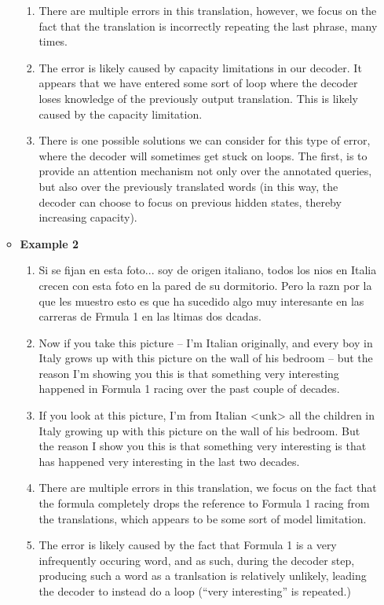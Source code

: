 \documentclass[12pt]{article}
\begin{document}
\begin{enumerate}[label=(\alph*)]
\begin{itemize}
\begin{enumerate}[label=\arabic*]
          \item There are multiple errors in this translation, however, we focus on the fact that the translation is incorrectly repeating the last phrase, many times.
          \item The error is likely caused by capacity limitations in our decoder. It appears that we have entered some sort of loop where the decoder loses knowledge of the previously output translation. This is likely caused by the capacity limitation.
          \item There is one possible solutions we can consider for this type of error, where the decoder will sometimes get stuck on loops. The first, is to provide an attention mechanism not only over the annotated queries, but also over the previously translated words (in this way, the decoder can choose to focus on previous hidden states, thereby increasing capacity).
        \end{enumerate}
      \item \textbf{Example 2}
        \begin{enumerate}[label=\arabic*]
          \item Si se fijan en esta foto... soy de origen italiano, todos los nios en Italia crecen con esta foto en la pared de su dormitorio. Pero la razn por la que les muestro esto es que ha sucedido algo muy interesante en las carreras de Frmula 1 en las ltimas dos dcadas.
          \item Now if you take this picture -- I'm Italian originally,  and every boy in Italy grows up  with this picture on the wall of his bedroom --  but the reason I'm showing you this  is that something very interesting  happened in Formula 1 racing  over the past couple of decades.
          \item If you look at this picture, I'm from Italian <unk> all the children in Italy growing up with this picture on the wall of his bedroom. But the reason I show you this is that something very interesting is that has happened very interesting in the last two decades.
          \item There are multiple errors in this translation, we focus on the fact that the formula completely drops the reference to Formula 1 racing from the translations, which appears to be some sort of model limitation.
          \item The error is likely caused by the fact that Formula 1 is a very infrequently occuring word, and as such, during the decoder step, producing such a word as a tranlsation is relatively unlikely, leading the decoder to instead do a loop (``very interesting'' is repeated.)

\end{enumerate}
\end{itemize}
\end{enumerate}
\end{document}
